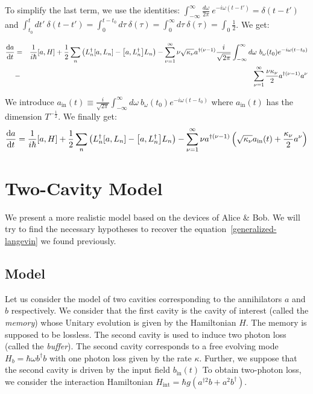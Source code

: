 To simplify the last term, we use the identities: $\int_{-\infty}^\infty \frac{d\omega}{2 \pi} \ e^{-i \omega (t - t')} = \delta(t - t')$ and $\int_{t_0}^t  dt' \ \delta(t - t') = \int_0^{t-t_0}  d\tau \ \delta(\tau) = \int_0^\infty  d\tau \ \delta(\tau) = \int_0 \frac{1}{2}$. We get:

\begin{eqnarray}
    \timeDeriv{a} &=& \ihbar \commutator{a}{H} + \frac{1}{2} \sum_n \left(L^\dagger_n \commutator{a}{L_n} - \commutator{a}{L^\dagger_n} L_n\right) - \sum_{\nu = 1}^\infty \nu \sqrt{\kappa_\nu} a^{\dagger (\nu-1)} \frac{i}{\sqrt{2 \pi}} \int_{-\infty}^\infty d\omega \ b_\omega(t_0) e^{-i \omega (t - t_0)} \nonumber\\
    &-& \sum_{\nu = 1}^\infty \frac{\nu \kappa_\nu}{2} a^{\dagger (\nu-1)} a^\nu
\end{eqnarray}

We introduce $a_{\text{in}}(t) \equiv \frac{i}{\sqrt{2 \pi}} \int_{-\infty}^\infty d\omega \ b_\omega(t_0) e^{-i \omega (t - t_0)}$ where $a_{\text{in}}(t)$ has the dimension $T^{-\frac{1}{2}}$. We finally get:
\begin{equation}
    \timeDeriv{a} = \ihbar \commutator{a}{H} + \frac{1}{2} \sum_n \left(L^\dagger_n \commutator{a}{L_n} - \commutator{a}{L^\dagger_n} L_n\right) - \sum_{\nu = 1}^\infty \nu a^{\dagger (\nu-1)} \left( \sqrt{\kappa_\nu}  a_{\text{in}}(t) + \frac{\kappa_\nu}{2}a^\nu \right)
\end{equation}

\section{Two-Cavity Model}
We present a more realistic model based on the devices of Alice \& Bob. We will try to find the necessary hypotheses to recover the equation~\autoref{generalized-langevin} we found previously.

\subsection{Model}

Let us consider the model of two cavities corresponding to the annihilators $a$ and $b$ respectively. We consider that the first cavity is the cavity of interest (called the \textit{memory}) whose Unitary evolution is given by the Hamiltonian $H$. The memory is supposed to be lossless. The second cavity is used to induce two photon loss (called the \textit{buffer}). The second cavity corresponds to a free evolving mode $H_b = \hbar \omega b^\dagger b$ with one photon loss given by the rate $\kappa$. Further, we suppose that the second cavity is driven by the input field $b_{\text{in}}(t)$ To obtain two-photon loss, we consider the interaction Hamiltonian $H_{\text{int}} = \hbar g \left(a^{\dagger 2} b + a^2 b^\dagger\right)$. 

